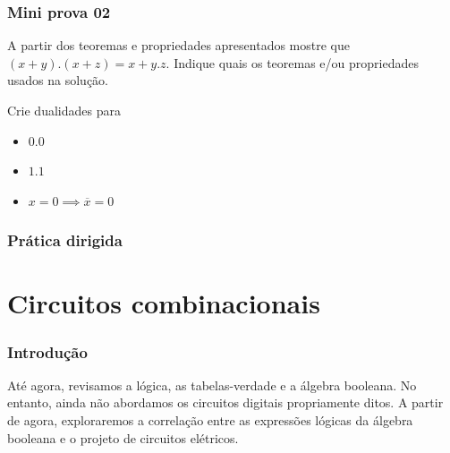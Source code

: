 \begin{frame}
	\frametitle{Mini prova 02}
	\par A partir dos teoremas e propriedades apresentados mostre que $(x+y).(x+z)=x+y.z$. Indique quais os teoremas e/ou propriedades usados na solução.\newline
	\par Crie dualidades para
	\begin{itemize}
		\item $0.0$
		\item $1.1$
		\item $x=0 \implies \overline{x}=0$
	\end{itemize}	
\end{frame}


\begin{frame}
	\frametitle{Prática dirigida}
\end{frame}

\section{Circuitos combinacionais}

\begin{frame}
	\frametitle{Introdução}
	\par Até agora, revisamos a lógica, as tabelas-verdade e a álgebra booleana. No entanto, ainda não abordamos os circuitos digitais propriamente ditos. A partir de agora, exploraremos a correlação entre as expressões lógicas da álgebra booleana e o projeto de circuitos elétricos.
\end{frame}

